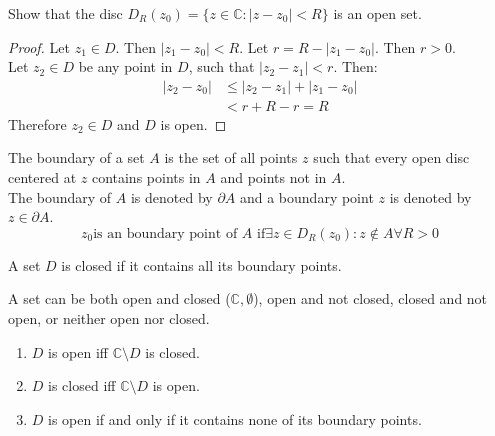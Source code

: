 \begin{example}
    Show that the disc $D_R(z_0) = \{z \in \mathbb{C} : |z - z_0| < R\}$ is an open set.
    \begin{proof}
        Let $z_1 \in D$. Then $|z_1 - z_0| < R$. Let $r = R - |z_1 - z_0|$. Then $r > 0$. \\
        Let $z_2 \in D$ be any point in $D$, such that $|z_2 - z_1| < r$. Then:
        \begin{align*}
            |z_2 - z_0| & \leq |z_2 - z_1| + |z_1 - z_0| \\
                        & < r + R - r = R
        \end{align*}
        Therefore $z_2 \in D$ and $D$ is open.
    \end{proof}
\end{example}

\begin{definition}
    The boundary of a set $A$ is the set of all points $z$ such that every open disc centered at $z$ contains points in $A$ and points not in $A$. \\
    The boundary of $A$ is denoted by $\partial A$ and a boundary point $z$ is denoted by $z \in \partial A$.
    \[z_0 \text{is an boundary point of $A$ if} \exists z \in D_{R}(z_0) :z \notin A \forall R> 0\]
\end{definition}

\begin{definition}
    A set $D$ is closed if it contains all its boundary points.
\end{definition}
\begin{remark}
    A set can be both open and closed ($\mathbb{C}, \emptyset$), open and not closed, closed and not open, or neither open nor closed.
\end{remark}
\begin{theorem}
    \begin{enumerate}
        \item $D$ is open iff $\mathbb{C} \setminus D$ is closed.
        \item $D$ is closed iff $\mathbb{C} \setminus D$ is open.
        \item $D$ is open if and only if it contains none of its boundary points.
    \end{enumerate}
\end{theorem}